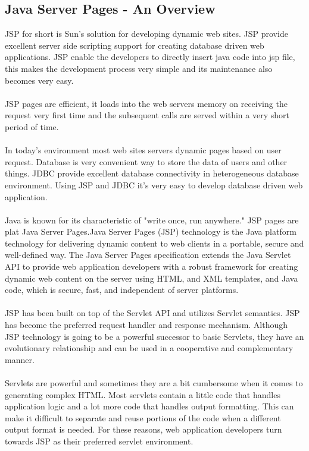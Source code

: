 \documentclass[BTech]{srmuthesis}
\begin{document}
\subsection{Java Server Pages - An Overview}
\ac{JSP} for short is Sun's solution for developing dynamic web sites. JSP provide excellent server side scripting support for creating database driven web applications. JSP enable the developers to directly insert java code into jsp file, this makes the development process very simple and its maintenance also becomes very easy.\\\\
JSP pages are efficient, it loads into the web servers memory  on receiving the request very first time and the subsequent calls are served within a very short period of time.\\\\
In today's environment most web sites servers dynamic pages based on user request. Database is very convenient way to store the data of users and other things. JDBC provide excellent database connectivity in heterogeneous database environment. Using JSP and JDBC it’s very easy to develop database driven web application.\\\\
Java is known for its characteristic of "write once, run anywhere." JSP pages are plat Java Server Pages.Java Server Pages (JSP) technology is the Java platform technology for delivering dynamic content to web clients in a portable, secure and well-defined way. The Java Server Pages specification extends the Java Servlet API to provide web application developers with a robust framework for creating dynamic web content on the server using HTML, and XML templates, and Java code, which is secure, fast, and independent of server platforms.\\\\
JSP has been built on top of the Servlet API and utilizes Servlet semantics. JSP has become the preferred request handler and response mechanism. Although JSP technology is going to be a powerful successor to basic Servlets, they have an evolutionary relationship and can be used in a cooperative and complementary manner.\\\\
Servlets are powerful and sometimes they are a bit cumbersome when it comes to generating complex HTML. Most servlets contain a little code that handles application logic and a lot more code that handles output formatting. This can make it difficult to separate and reuse portions of the code when a different output format is needed. For these reasons, web application developers turn towards JSP as their preferred servlet environment.\\
\end{document}
